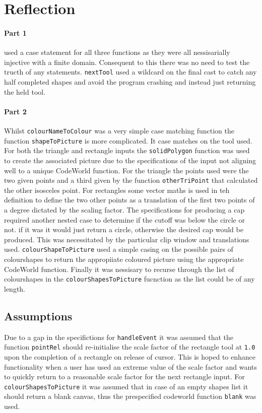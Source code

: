 \documentclass[11pt]{article}
\begin{document}
\section{Reflection}
\paragraph{Part 1} used a case statement for all three functions as they were all nessisarially injective with a finite domain. Consequent to this there was no need to test the tructh of any statements. \verb|nextTool| used a wildcard on the final cast to catch any half completed shapes and avoid the program crashing and instead just returning the held tool.
\paragraph{Part 2} Whilst \verb|colourNameToColour| was a very simple case matching function the function \verb|shapeToPicture| is more complicated. It case matches on the tool used. For both the triangle and rectangle inputs the \verb|solidPolygon| function was used to create the associated picture due to the specifications of the input not aligning well to a unique CodeWorld  function. For the triangle the points used were the two given points and a third given by the function \verb|otherTriPoint| that calculated the other isosceles point. For rectangles some vector maths is used in teh definition to define the two other points as a translation of the first two points of a degree dictated by the scaling factor. The specifications for producing a cap required another nested case to determine if the cutoff was below the circle or not. if it was it would just return a circle, otherwise the desired cap would be produced. This was necessitated by the particular clip window and translations used. \verb|colourShapeToPicture| used a simple casing on the possible pairs of colourshapes to return the appropiiate coloured picture using the appropriate CodeWorld function. Finally it was nessisary to recurse through the list of colourshapes in the \verb|colourShapesToPicture| fucnction as the list could be of any length.


\subsection{Assumptions}%
Due to a gap in the specifictions for \verb|handleEvent| it was assumed that the function \verb|pointRel| should re-initialise the scale factor of the rectangle tool at \verb|1.0| upon the completion of a rectangle on release of cursor. This is hoped to enhance functionality when a user has used an extreme value of the scale factor and wants to quickly return to a reasonable scale factor for the next rectangle input. For \verb|colourShapesToPicture| it was assumed that in case of an empty shapes list it should return a blank canvas, thus the prespecified codeworld function \verb|blank| was used.
\end{document}
